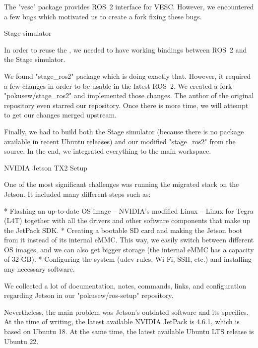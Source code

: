 The "vesc" package provides ROS~2 interface for VESC. However, we encountered a few bugs which motivated us to create a fork fixing these bugs.


\secc Stage simulator

In order to reuse the , we needed to have working bindings between ROS~2 and the Stage simulator.

We found "stage_ros2" package which is doing exactly that. However, it required a few changes in order to be usable in the latest ROS~2. We created a fork "pokusew/stage_ros2" and implemented those changes. The author of the original repository even starred our repository. Once there is more time, we will attempt to get our changes merged upstream.

Finally, we had to build both the Stage simulator (because there is no package available in recent Ubuntu releases) and our modified "stage_ros2" from the source. In the end, we integrated everything to the main workspace.

\vfill

\secc NVIDIA Jetson TX2 Setup

One of the most significant challenges was running the migrated stack on the Jetson. It included many different steps such as:

\begitems
* Flashing an up-to-date OS image – NVIDIA's modified Linux – Linux for Tegra (L4T) together with all the drivers and other software components that make up the JetPack SDK.
* Creating a bootable SD card and making the Jetson boot from it instead of its internal eMMC. This way, we easily switch between different OS images, and we can also get bigger storage (the internal eMMC has a capacity of 32 GB).
* Configuring the system (udev rules, Wi-Fi, SSH, etc.) and installing any necessary software.
\enditems

We collected a lot of documentation, notes, commands, links, and configuration regarding Jetson in our "pokusew/ros-setup" repository.

Nevertheless, the main problem was Jetson's outdated software and its specifics. At the time of writing, the latest available NVIDIA JetPack is 4.6.1, which is based on Ubuntu 18. At the same time, the latest available Ubuntu LTS release is Ubuntu 22.

